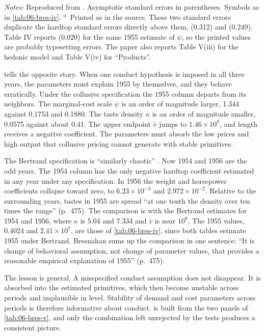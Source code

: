 \begin{table}[t]
\smallskip
\begin{minipage}{0.95\textwidth}
\footnotesize
\emph{Notes:} Reproduced from \citet[Tables V(i) and V(ii), pp.~473--474]{Bresnahan1987}. Asymptotic standard errors in
parentheses. Symbols as in \cref{tab:06-bres-iv}. $^{a}$~Printed as in the source. These two standard errors
duplicate the hardtop standard errors directly above them, (0.312) and (0.249). Table IV reports (0.020) for the
same 1955 estimate of $\psi$, so the printed values are probably typesetting errors. The paper also reports Table
V(iii) for the hedonic model and Table V(iv) for ``Products''.
\end{minipage}
\end{table}

 tells the opposite story. When one conduct hypothesis is imposed in all three years, the
parameters must explain 1955 by themselves, and they behave erratically. Under the collusive specification the 1955
column departs from its neighbors. The marginal-cost scale $\psi$ is an order of magnitude larger, 1.344 against
0.1753 and 0.1880. The taste density $\kappa$ is an order of magnitude smaller, 0.0575 against about 0.41. The upper
endpoint $\bar v$ jumps to $1.46\times10^{8}$, and length receives a negative coefficient. The parameters must absorb
the low prices and high output that collusive pricing cannot generate with stable primitives.

The Bertrand specification is ``similarly chaotic'' \citep[p.~473]{Bresnahan1987}. Now 1954 and 1956 are the odd
years. The 1954 column has the only negative hardtop coefficient estimated in any year under any specification. In 1956 the
weight and horsepower coefficients collapse toward zero, to $6.23\times10^{-3}$ and $2.972\times10^{-2}$. Relative to
the surrounding years, tastes in 1955 are spread ``at one tenth the density over ten times the range'' (p.~475).
The comparison is with the Bertrand estimates for 1954 and 1956, where $\kappa$ is 5.04 and 7.334 and $\bar v$ is near
$10^{6}$. The 1955 values, 0.4024 and $2.41\times10^{7}$, are those of \cref{tab:06-bres-iv}, since both tables estimate 1955
under Bertrand.
Bresnahan sums up the comparison in one sentence: ``It is change of behavioral assumption, not change of parameter
values, that provides a reasonable empirical explanation of 1955'' (p.~475).

The lesson is general. A misspecified conduct assumption does not disappear. It is absorbed into the estimated
primitives, which then become unstable across periods and implausible in level. Stability of demand and cost
parameters across periods is therefore informative about conduct.  is built from the two panels
of \cref{tab:06-bres-v}, and only the combination left unrejected by the tests produces a consistent picture.

